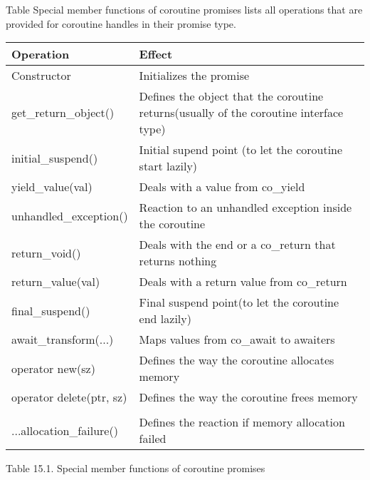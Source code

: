 
Table Special member functions of coroutine promises lists all operations that are provided for coroutine handles in their promise type.

\begin{longtable}[c]{|l|l|}
\hline
\textbf{Operation}       & \textbf{Effect}                                          \\ \hline
\endfirsthead
%
\endhead
%
Constructor              & Initializes the promise                                  \\ \hline
get\_return\_object() &
Defines the object that the coroutine returns(usually of the coroutine interface type) \\ \hline
initial\_suspend()       & Initial supend point (to let the coroutine start lazily) \\ \hline
yield\_value(val)        & Deals with a value from co\_yield                        \\ \hline
unhandled\_exception()   & Reaction to an unhandled exception inside the coroutine  \\ \hline
return\_void()           & Deals with the end or a co\_return that returns nothing  \\ \hline
return\_value(val)       & Deals with a return value from co\_return                \\ \hline
final\_suspend()         & Final suspend point(to let the coroutine end lazily)     \\ \hline
await\_transform(...)    & Maps values from co\_await to awaiters                   \\ \hline
operator new(sz)         & Defines the way the coroutine allocates memory           \\ \hline
operator delete(ptr, sz) & Defines the way the coroutine frees memory               \\ \hline
\begin{tabular}[c]{@{}l@{}}get\_return\_object\_on\_...\\ ...allocation\_failure()\end{tabular} &
Defines the reaction if memory allocation failed \\ \hline
\end{longtable}

\begin{center}
Table 15.1. Special member functions of coroutine promises
\end{center}

